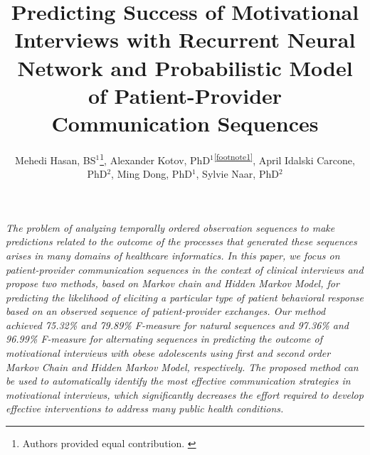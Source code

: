 \documentclass{amia_summit_2018}
\begin{document}
\title{Predicting Success of Motivational Interviews with Recurrent Neural Network and Probabilistic Model of Patient-Provider Communication Sequences}

\author{Mehedi Hasan, BS$^{1}$\footnote[1]{Authors provided equal contribution. \label{footnote1}}, Alexander Kotov, PhD$^{1}$\textsuperscript{\ref{footnote1}}, April Idalski Carcone, PhD$^{2}$, Ming Dong, PhD$^{1}$, Sylvie Naar, PhD$^{2}$}


\maketitle

\textit{The problem of analyzing temporally ordered observation sequences to make predictions related to the outcome of the processes that generated these sequences arises in many domains of healthcare informatics. In this paper, we focus on patient-provider communication sequences in the context of clinical interviews and propose two methods, based on Markov chain and Hidden Markov Model, for predicting the likelihood of eliciting a particular type of patient behavioral response based on an observed sequence of patient-provider exchanges.  Our method achieved 75.32\% and 79.89\% F-measure for natural sequences and 97.36\% and 96.99\% F-measure for alternating sequences in predicting the outcome of motivational interviews with obese adolescents using first and second order Markov Chain and Hidden Markov Model, respectively. The proposed method can be used to automatically identify the most effective communication strategies in motivational interviews, which significantly decreases the effort required to develop effective interventions to address many public health conditions.}
\end{document}
